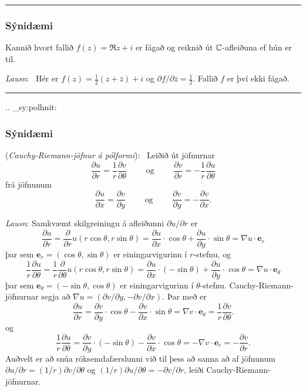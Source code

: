 \bigskip\hrule\bigskip

\subsubsection{Sýnidæmi}  Kannið hvort fallið $f(z)= \Re z + i$ er fágað og reiknið
út ${\mathbb C}$-afleiðuna ef hún er til.

\smallskip
{\it Lausn}: \ Hér er $f(z)=\tfrac 12(z+\bar z)+i$ og 
${\partial} f/{\partial}\bar z=\tfrac 12$.  Fallið $f$ er því ekki
fágað.



\bigskip\hrule\bigskip

 

.. _sy:polhnit:

\subsubsection{Sýnidæmi} ({\it Cauchy-Riemann-jöfnur á pólformi}): \  Leiðið út 
jöfnurnar 
$$\dfrac{\partial u}{\partial r}=\dfrac 1r\dfrac{\partial v}{\partial
\theta} \qquad \text{ og } \qquad 
\dfrac{\partial v}{\partial r}=-\dfrac 1r\dfrac{\partial u}{\partial
\theta} 
$$ 
frá jöfnunum
$$
\dfrac{\partial u}{\partial x}=\dfrac{\partial v}{\partial y}
\qquad \text{  og } \qquad 
\dfrac{\partial v}{\partial y}=-\dfrac{\partial v}{\partial x}.
$$      

\smallskip\noindent
{\it Lausn}: Samkvæmt skilgreiningu á afleiðunni $\partial u/\partial
r$ er 
$$
\dfrac{\partial u}{\partial r}=\dfrac{\partial}{\partial r} u(r\cos
\theta,r\sin \theta)=\dfrac{\partial u}{\partial x} \cdot \cos \theta
+\dfrac{\partial u}{\partial y}\cdot \sin \theta=\nabla u\cdot 
{\mathbf e}_r
$$
þar sem ${\mathbf e}_r=(\cos \theta,\sin \theta)$ er einingarvigurinn
í $r$-stefnu, og 
$$
\dfrac 1 r\dfrac{\partial u}{\partial \theta}=\dfrac 1r
\dfrac{\partial}{\partial \theta} u(r\cos
\theta,r\sin \theta)=\dfrac{\partial u}{\partial x}\cdot (-\sin \theta)+
\dfrac{\partial u}{\partial y}\cdot \cos \theta=\nabla u\cdot 
{\mathbf e}_\theta
$$
þar sem ${\mathbf e}_\theta=(-\sin \theta,\cos \theta)$ er einingarvigurinn
í $\theta$-stefnu.  Cauchy-Riemann-jöfnurnar segja að 
$\nabla u=(\partial v/\partial y,-\partial v/\partial x)$.  Þar með er
$$
\dfrac{\partial u}{\partial r}=\dfrac{\partial v}{\partial
y}\cdot \cos\theta -\dfrac{\partial v}{\partial x}\cdot \sin \theta= \nabla v\cdot
{\mathbf e}_\theta=\dfrac 1r \dfrac{\partial v}{\partial \theta}.
$$
og 
$$
\dfrac 1r\dfrac{\partial u}{\partial \theta}=\dfrac{\partial v}{\partial
y}\cdot (-\sin\theta) -\dfrac{\partial v}{\partial x}\cdot \cos \theta= -\nabla v\cdot
{\mathbf e}_r=-\dfrac{\partial v}{\partial r}.
$$
 Auðvelt er að snúa röksemdafærslunni við til þess að sanna að
af jöfnunum $\partial u/\partial r=(1/r)\partial v/\partial \theta$
og $(1/r)\partial u/\partial \theta =-\partial v/\partial r$,
leiði Cauchy-Riemann-jöfnurnar.



